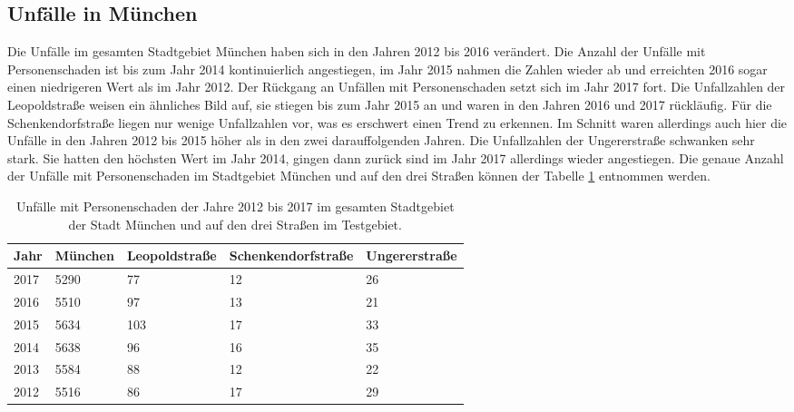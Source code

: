 
\subsection{Unfälle in München} %
Die Unfälle im gesamten Stadtgebiet München haben sich in den Jahren 2012 bis 2016 verändert. Die Anzahl der Unfälle mit Personenschaden ist bis zum Jahr 2014 kontinuierlich angestiegen, im Jahr 2015 nahmen die Zahlen wieder ab und erreichten 2016 sogar einen niedrigeren Wert als im Jahr 2012. Der Rückgang an Unfällen mit Personenschaden setzt sich im Jahr 2017 fort. Die Unfallzahlen der Leopoldstraße weisen ein ähnliches Bild auf, sie stiegen bis zum Jahr 2015 an und waren in den Jahren 2016 und 2017 rückläufig. Für die Schenkendorfstraße liegen nur wenige Unfallzahlen vor, was es erschwert einen Trend zu erkennen. Im Schnitt waren allerdings auch hier die Unfälle in den Jahren 2012 bis 2015 höher als in den zwei darauffolgenden Jahren. Die Unfallzahlen der Ungererstraße schwanken sehr stark. Sie hatten den höchsten Wert im Jahr 2014, gingen dann zurück sind im Jahr 2017 allerdings wieder angestiegen. Die genaue Anzahl der Unfälle mit Personenschaden im Stadtgebiet München und auf den drei Straßen können der Tabelle \ref{tab:Unfälle München Personenschaden} entnommen werden.

\begin{table}[htpb]
	\scriptsize
	\caption[Unfälle mit Personenschaden]{Unfälle mit Personenschaden der Jahre 2012 bis 2017 im gesamten Stadtgebiet der Stadt München und auf den drei Straßen im Testgebiet.}\label{tab:Unfälle München Personenschaden}
	\centering
	\begin{tabular}{l l l  l p{3cm}}
		\toprule
		Jahr & München & Leopoldstraße & Schenkendorfstraße & Ungererstraße \\
		\midrule
		2017 & 5290\footnotemark[1] & 77 & 12 & 26\\
		2016 & 5510\footnotemark[2] & 97 & 13 & 21\\
		2015 & 5634\footnotemark[3] & 103 & 17 & 33\\
		2014 & 5638\footnotemark[4] & 96 & 16 & 35\\
		2013 & 5584\footnotemark[5] & 88 & 12 & 22\\
		2012 & 5516\footnotemark[6] & 86 & 17 & 29\\
		\bottomrule
	\end{tabular}
\end{table}

